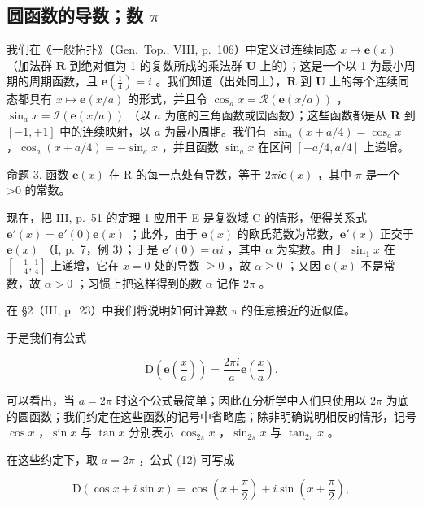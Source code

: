 \subsection{\texorpdfstring{圆函数的导数；数 \(\pi\)}{圆函数的导数；数 π}}

我们在《一般拓扑》（Gen.~Top., VIII, p.~106）中定义过连续同态 \(x \mapsto \mathbf{e}(x)\) （加法群 \(\mathbf{R}\) 到绝对值为 1 的复数所成的乘法群 \(\mathbf{U}\) 上的）；这是一个以 1 为最小周期的周期函数，且 \(\mathbf{e}\left(\frac{1}{4}\right) = i\) 。我们知道（出处同上），\(\mathbf{R}\) 到 \(\mathbf{U}\) 上的每个连续同态都具有 \(x \mapsto \mathbf{e}(x / a)\) 的形式，并且令 \(\cos_a x = \mathcal{R}(\mathbf{e}(x / a))\) ，\(\sin_a x = \mathcal{I}(\mathbf{e}(x / a))\) （以 \(a\) 为底的三角函数或圆函数）；这些函数都是从 \(\mathbf{R}\) 到 \([-1, +1]\) 中的连续映射，以 \(a\) 为最小周期。我们有 \(\sin_a(x + a / 4) = \cos_a x\) ，\(\cos_a(x + a / 4) = -\sin_a x\) ，并且函数 \(\sin_a x\) 在区间 \([-a / 4, a / 4]\) 上递增。

命题 3. 函数 \(\mathbf{e}(x)\) 在 R 的每一点处有导数，等于 \(2\pi i\mathbf{e}(x)\) ，其中 \(\pi\) 是一个 \textgreater0 的常数。

现在，把 III, p.~51 的定理 1 应用于 E 是复数域 C 的情形，便得关系式 \(\mathbf{e}'(x) = \mathbf{e}'(0)\mathbf{e}(x)\) ；此外，由于 \(\mathbf{e}(x)\) 的欧氏范数为常数，\(\mathbf{e}'(x)\) 正交于 \(\mathbf{e}(x)\) （I, p.~7，例 3）；于是 \(\mathbf{e}'(0) = \alpha i\) ，其中 \(\alpha\) 为实数。由于 \(\sin_1 x\) 在 \([- \frac{1}{4}, \frac{1}{4}]\) 上递增，它在 \(x = 0\) 处的导数 \(\geqslant 0\) ，故 \(\alpha \geqslant 0\) ；又因 \(\mathbf{e}(x)\) 不是常数，故 \(\alpha > 0\) ；习惯上把这样得到的数 \(\alpha\) 记作 \(2\pi\) 。

在 §2（III, p.~23）中我们将说明如何计算数 \(\pi\) 的任意接近的近似值。

于是我们有公式

\[
\mathrm{D} \left(\mathbf {e} \left(\frac {x}{a}\right)\right) = \frac {2 \pi i}{a} \mathbf {e} \left(\frac {x}{a}\right).\tag{12}
\]

可以看出，当 \(a = 2\pi\) 时这个公式最简单；因此在分析学中人们只使用以 \(2\pi\) 为底的圆函数；我们约定在这些函数的记号中省略底；除非明确说明相反的情形，记号 \(\cos x\) ，\(\sin x\) 与 \(\tan x\) 分别表示 \(\cos_{2\pi}x\) ，\(\sin_{2\pi}x\) 与 \(\tan_{2\pi}x\) 。

在这些约定下，取 \(a = 2\pi\) ，公式 (12) 可写成

\[
\mathrm{D} (\cos x + i \sin x) = \cos \left(x + \frac {\pi}{2}\right) + i \sin \left(x + \frac {\pi}{2}\right),\tag{13}
\]

